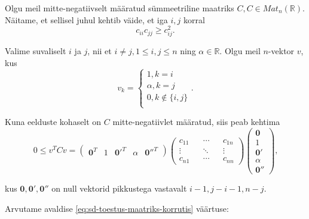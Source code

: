 \documentclass[a4paper,12pt,oneside]{article}
\numberwithin{equation}{section}
\theoremstyle{definition}
\begin{document}
Olgu meil mitte-negatiivselt määratud s\"ummeetriline maatriks $C, C \in Mat_{n}(\mathbb{R})$. Näitame, et sellisel juhul kehtib väide, et iga $i,j$ korral
\begin{equation*}
c_{ii}c_{jj} \geq c_{ij}^2 \text{.}
\end{equation*}

Valime suvaliselt $i$ ja $j$, nii et $i \neq j, 1 \leq i,j \leq n$ ning $\alpha \in \mathbb{R}$. Olgu meil $n$-vektor $v$, kus
\begin{equation*}
v_k =
\begin{cases}
1, k=i \\
\alpha, k=j \\
0, k \not \in \lbrace i, j \rbrace \\
\end{cases} \text{.}
\end{equation*}

Kuna eelduste kohaselt on $C$ mitte-negatiivlet määratud, siis peab kehtima 
\begin{equation}
\label{eq:sd-toestus-maatriks-korrutis}
0 \leq v^{T}Cv = 
\begin{pmatrix}
\mathbf{0}^T & 1 & \mathbf{0'}^T & \alpha & \mathbf{0''}^T
\end{pmatrix}
\begin{pmatrix}
c_{11} && \cdots && c_{1n} \\
\vdots && \ddots && \vdots \\
c_{n1} && \cdots && c_{nn}  
\end{pmatrix}
\begin{pmatrix}
\mathbf{0} \\ 
1 \\
\mathbf{0'} \\
\alpha \\
\mathbf{0''} 
\end{pmatrix} \text{,}
\end{equation}

kus $\mathbf{0},\mathbf{0'},\mathbf{0''}$ on null vektorid pikkustega vastavalt $i-1,j-i-1, n -j$.



Arvutame avaldise \ref{eq:sd-toestus-maatriks-korrutis} väärtuse:
\end{document}
